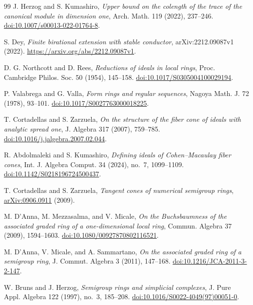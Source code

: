 \documentclass[11pt]{article}
\theoremstyle{definition}
\theoremstyle{remark}
\begin{document}
{\begin{thebibliography}{99}
J. Herzog and S. Kumashiro,
\emph{Upper bound on the colength of the trace of the canonical module in dimension one},
Arch. Math. 119 (2022), 237--246.
\href{https://doi.org/10.1007/s00013-022-01764-8}{doi:10.1007/s00013-022-01764-8}.

S. Dey,
\emph{Finite birational extension with stable conductor},
arXiv:2212.09087v1 (2022).
\url{https://arxiv.org/abs/2212.09087v1}.

D. G. Northcott and D. Rees,
\emph{Reductions of ideals in local rings},
Proc. Cambridge Philos. Soc. 50 (1954), 145--158.
\href{https://doi.org/10.1017/S0305004100029194}{doi:10.1017/S0305004100029194}.

P. Valabrega and G. Valla,
\emph{Form rings and regular sequences},
Nagoya Math. J. 72 (1978), 93--101.
\href{https://doi.org/10.1017/S0027763000018225}{doi:10.1017/S0027763000018225}.

T. Cortadellas and S. Zarzuela,
\emph{On the structure of the fiber cone of ideals with analytic spread one},
J. Algebra 317 (2007), 759--785.
\href{https://doi.org/10.1016/j.jalgebra.2007.02.044}{doi:10.1016/j.jalgebra.2007.02.044}.

R. Abdolmaleki and S. Kumashiro,
\emph{Defining ideals of Cohen--Macaulay fiber cones},
Int. J. Algebra Comput. 34 (2024), no.~7, 1099--1109.
\href{https://doi.org/10.1142/S0218196724500437}{doi:10.1142/S0218196724500437}.

T. Cortadellas and S. Zarzuela,
\emph{Tangent cones of numerical semigroup rings},
\href{https://arxiv.org/abs/0906.0911}{arXiv:0906.0911} (2009).

M. D'Anna, M. Mezzasalma, and V. Micale,
\emph{On the Buchsbaumness of the associated graded ring of a one-dimensional local ring},
Commun. Algebra 37 (2009), 1594--1603.
\href{https://doi.org/10.1080/00927870802116521}{doi:10.1080/00927870802116521}.

M. D'Anna, V. Micale, and A. Sammartano,
\emph{On the associated graded ring of a semigroup ring},
J. Commut. Algebra 3 (2011), 147--168.
\href{https://doi.org/10.1216/JCA-2011-3-2-147}{doi:10.1216/JCA-2011-3-2-147}.

W. Bruns and J. Herzog,
\emph{Semigroup rings and simplicial complexes},
J. Pure Appl. Algebra 122 (1997), no.~3, 185--208.
\href{https://doi.org/10.1016/S0022-4049(97)00051-0}{doi:10.1016/S0022-4049(97)00051-0}.


\end{thebibliography}}
\end{document}
